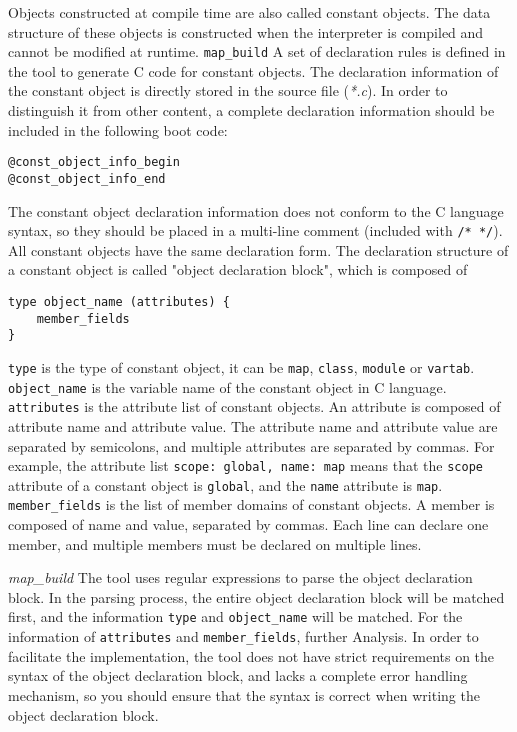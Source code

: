 Objects constructed at compile time are also called constant objects. The data structure of these objects is constructed when the interpreter is compiled and cannot be modified at runtime. \texttt{map\_build} A set of declaration rules is defined in the tool to generate C code for constant objects. The declaration information of the constant object is directly stored in the source file (\textsl{*.c}). In order to distinguish it from other content, a complete declaration information should be included in the following boot code:
\begin{lstlisting}[numbers=none]
@const_object_info_begin
@const_object_info_end
\end{lstlisting}
The constant object declaration information does not conform to the C language syntax, so they should be placed in a multi-line comment (included with \texttt{/* */}). All constant objects have the same declaration form. The declaration structure of a constant object is called "object declaration block", which is composed of
\begin{lstlisting}[numbers=none]
type object_name (attributes) {
    member_fields
}
\end{lstlisting}
\texttt{type} is the type of constant object, it can be \texttt{map}, \texttt{class}, \texttt{module} or \texttt{vartab}. \texttt{object\_name} is the variable name of the constant object in C language. \texttt{attributes} is the attribute list of constant objects. An attribute is composed of attribute name and attribute value. The attribute name and attribute value are separated by semicolons, and multiple attributes are separated by commas. For example, the attribute list \texttt{scope: global, name: map} means that the \texttt{scope} attribute of a constant object is \texttt{global}, and the \texttt{name} attribute is \texttt{map}. \texttt{member\_fields} is the list of member domains of constant objects. A member is composed of name and value, separated by commas. Each line can declare one member, and multiple members must be declared on multiple lines.

\textsl{map\_build} The tool uses regular expressions to parse the object declaration block. In the parsing process, the entire object declaration block will be matched first, and the information \texttt{type} and \texttt{object\_name} will be matched. For the information of \texttt{attributes} and \texttt{member\_fields}, further Analysis. In order to facilitate the implementation, the tool does not have strict requirements on the syntax of the object declaration block, and lacks a complete error handling mechanism, so you should ensure that the syntax is correct when writing the object declaration block.

